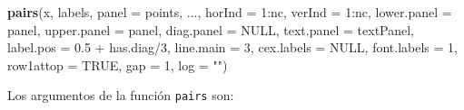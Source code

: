 \documentclass[10pt,]{krantz}
\makeatletter
\newenvironment{Shaded}{\begin{snugshade}}{\end{snugshade}}
\newcommand{\KeywordTok}[1]{\textcolor[rgb]{0.13,0.29,0.53}{\textbf{{#1}}}}
\newcommand{\DataTypeTok}[1]{\textcolor[rgb]{0.13,0.29,0.53}{{#1}}}
\newcommand{\DecValTok}[1]{\textcolor[rgb]{0.00,0.00,0.81}{{#1}}}
\newcommand{\FloatTok}[1]{\textcolor[rgb]{0.00,0.00,0.81}{{#1}}}
\newcommand{\StringTok}[1]{\textcolor[rgb]{0.31,0.60,0.02}{{#1}}}
\newcommand{\OtherTok}[1]{\textcolor[rgb]{0.56,0.35,0.01}{{#1}}}
\newcommand{\NormalTok}[1]{{#1}}
\newenvironment{kframe}{%
\medskip{}
\setlength{\fboxsep}{.8em}
 \def\at@end@of@kframe{}%
 \ifinner\ifhmode%
  \def\at@end@of@kframe{\end{minipage}}%
  \begin{minipage}{\columnwidth}%
 \fi\fi%
 \def\FrameCommand##1{\hskip\@totalleftmargin \hskip-\fboxsep
 \colorbox{shadecolor}{##1}\hskip-\fboxsep
     \hskip-\linewidth \hskip-\@totalleftmargin \hskip\columnwidth}%
 \MakeFramed {\advance\hsize-\width
   \@totalleftmargin\z@ \linewidth\hsize
   \@setminipage}}%
 {\par\unskip\endMakeFramed%
 \at@end@of@kframe}
\renewenvironment{Shaded}{\begin{kframe}}{\end{kframe}}
\makeatother
\begin{document}
\begin{Shaded}
\begin{Highlighting}[]
\KeywordTok{pairs}\NormalTok{(x, labels, }\DataTypeTok{panel =} \NormalTok{points, ...,}
      \DataTypeTok{horInd =} \DecValTok{1}\NormalTok{:nc, }\DataTypeTok{verInd =} \DecValTok{1}\NormalTok{:nc,}
      \DataTypeTok{lower.panel =} \NormalTok{panel, }\DataTypeTok{upper.panel =} \NormalTok{panel,}
      \DataTypeTok{diag.panel =} \OtherTok{NULL}\NormalTok{, }\DataTypeTok{text.panel =} \NormalTok{textPanel,}
      \DataTypeTok{label.pos =} \FloatTok{0.5} \NormalTok{+}\StringTok{ }\NormalTok{has.diag/}\DecValTok{3}\NormalTok{, }\DataTypeTok{line.main =} \DecValTok{3}\NormalTok{,}
      \DataTypeTok{cex.labels =} \OtherTok{NULL}\NormalTok{, }\DataTypeTok{font.labels =} \DecValTok{1}\NormalTok{,}
      \DataTypeTok{row1attop =} \OtherTok{TRUE}\NormalTok{, }\DataTypeTok{gap =} \DecValTok{1}\NormalTok{, }\DataTypeTok{log =} \StringTok{""}\NormalTok{)}
\end{Highlighting}
\end{Shaded}

Los argumentos de la función \texttt{pairs} son:
\end{document}
